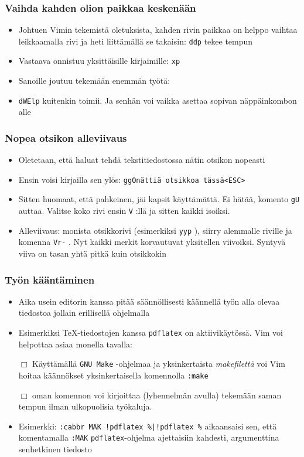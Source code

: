 \documentclass[]{beamer}
\newcommand{\Tohj}[1]{\texttt{#1}}
\newcommand{\com}[1]{{\color{blue!50!black}\Tohj{#1}} \!\!}
\newcommand{\code}[1]{\texttt{#1}}
\begin{document}
\begin{frame}
    \frametitle{Vaihda kahden olion paikkaa keskenään}
    \begin{itemize}
        \item Johtuen Vimin tekemistä oletuksista, kahden rivin paikkaa on helppo vaihtaa leikkaamalla rivi ja heti liittämällä se takaisin: \com{ddp} tekee tempun
        \pause
        \item Vastaava onnistuu yksittäisille kirjaimille: \com{xp} 
        \pause
        \item Sanoille joutuu tekemään enemmän työtä: 
        \item \com{dWElp} kuitenkin toimii. Ja senhän voi vaikka asettaa sopivan näppäinkombon alle
    \end{itemize}
\end{frame}

\begin{frame}
    \frametitle{Nopea otsikon alleviivaus}
    \begin{itemize}
        \item Oletetaan, että haluat tehdä tekstitiedostossa nätin otsikon nopeasti
        \pause
        \item Ensin voisi kirjailla sen ylös: \code{ggOnättiä otsikkoa tässä<ESC>}
        \pause
        \item Sitten huomaat, että pahkeinen, jäi kapsit käyttämättä. Ei hätää, komento \com{gU} auttaa. Valitse koko rivi ensin \com{V}:llä ja sitten kaikki isoiksi.
        \pause
        \item Alleviivaus: monista otsikkorivi (esimerkiksi \com{yyp}), siirry alemmalle riville ja komenna \com{Vr-}. Nyt kaikki merkit korvautuvat yksitellen viivoiksi. Syntyvä viiva on tasan yhtä pitkä kuin otsikkokin
    \end{itemize}
\end{frame}

\begin{frame}
    \frametitle{Työn kääntäminen}
    \begin{itemize}
        \item Aika usein editorin kanssa pitää säännöllisesti käännellä työn alla olevaa tiedostoa jollain erillisellä ohjelmalla
        \pause
        \item Esimerkiksi \TeX -tiedostojen kanssa \Tohj{pdflatex} on aktiivikäytössä. Vim voi helpottaa asiaa monella tavalla:
        \pause
        \item[$\Box$] Käyttämällä \Tohj{GNU Make} -ohjelmaa ja yksinkertaista \emph{makefilettä} voi Vim hoitaa käännökset yksinkertaisella komennolla \com{:make}
        \pause
        \item[$\Box$] oman komennon voi kirjoittaa (lyhennelmän avulla) tekemään saman tempun ilman ulkopuolisia työkaluja.
        \pause
        \item Esimerkki: \com{:cabbr MAK !pdflatex \%|!pdflatex \%} aikaansaisi sen, että komentamalla \com{:MAK} \Tohj{pdflatex}-ohjelma ajettaisiin kahdesti, argumenttina senhetkinen tiedosto
    \end{itemize}
\end{frame}
\end{document}
